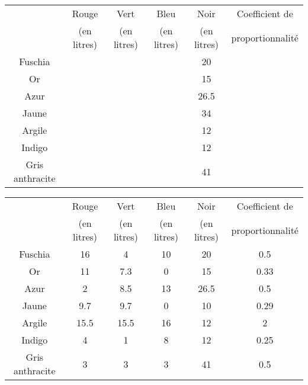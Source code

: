 \documentclass[a4paper,10pt]{beamer}
\begin{document}
{\small
\renewcommand{\arraystretch}{1.5}
\begin{frame}
	\hspace*{-0.5cm}\begin{tabular}{|c|c|c|c|c|c|}
		\hline
		                & Rouge       & Vert        & Bleu        & Noir        & Coefficient de   \\
		                & (en litres) & (en litres) & (en litres) & (en litres) & proportionnalité \\ \hline
		Fuschia         &             &             &             & 20          &                  \\ \hline
		Or              &             &             &             & 15          &                  \\ \hline
		Azur            &             &             &             & 26.5        &                  \\ \hline
		Jaune           &             &             &             & 34          &                  \\ \hline
		Argile          &             &             &             & 12          &                  \\ \hline
		Indigo          &             &             &             & 12          &                  \\ \hline
		Gris anthracite &             &             &             & 41          &                  \\ \hline
	\end{tabular}
\end{frame}

\begin{frame}
	\hspace*{-0.5cm}\begin{tabular}{|c|c|c|c|c|c|}
		\hline
		                & Rouge       & Vert        & Bleu        & Noir        & Coefficient de   \\
		                & (en litres) & (en litres) & (en litres) & (en litres) & proportionnalité \\ \hline
		Fuschia         & 16          & 4           & 10          & 20          & 0.5              \\ \hline
		Or              & 11          & 7.3         & 0           & 15          & 0.33             \\ \hline
		Azur            & 2           & 8.5         & 13          & 26.5        & 0.5              \\ \hline
		Jaune           & 9.7         & 9.7         & 0           & 10          & 0.29             \\ \hline
		Argile          & 15.5        & 15.5        & 16          & 12          & 2                \\ \hline
		Indigo          & 4           & 1           & 8           & 12          & 0.25             \\ \hline
		Gris anthracite & 3           & 3           & 3           & 41          & 0.5              \\ \hline
	\end{tabular}
\end{frame}
}

\renewcommand{\arraystretch}{1}
\end{document}
